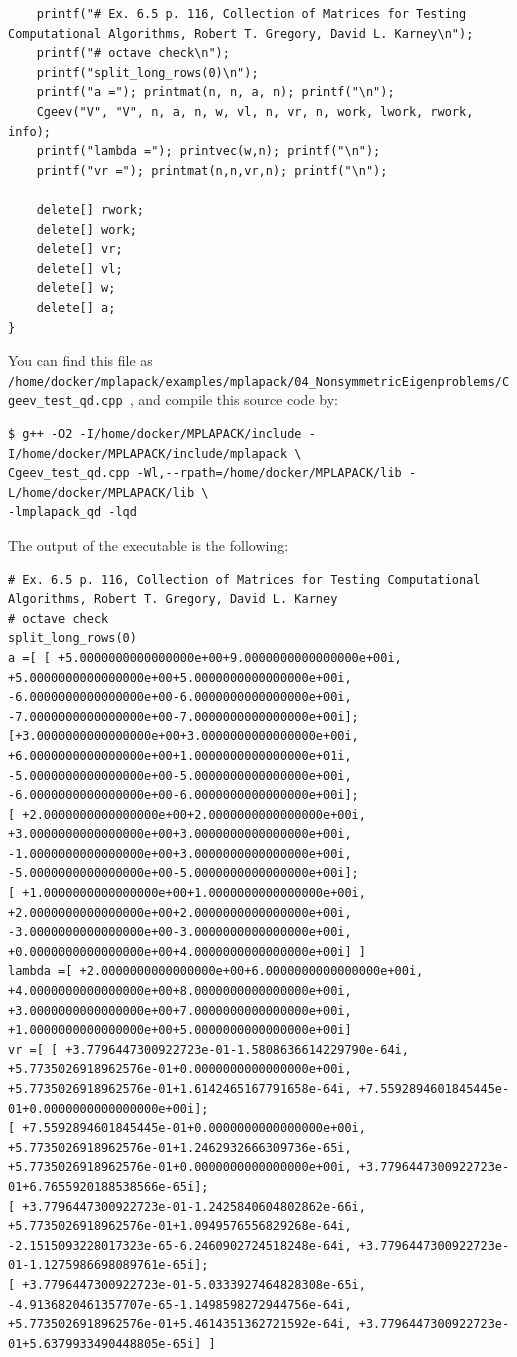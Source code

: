 \documentclass[12pt]{article}
\begin{document}
\begin{lstlisting}
    printf("# Ex. 6.5 p. 116, Collection of Matrices for Testing Computational Algorithms, Robert T. Gregory, David L. Karney\n");
    printf("# octave check\n");
    printf("split_long_rows(0)\n");
    printf("a ="); printmat(n, n, a, n); printf("\n");
    Cgeev("V", "V", n, a, n, w, vl, n, vr, n, work, lwork, rwork, info);
    printf("lambda ="); printvec(w,n); printf("\n");
    printf("vr ="); printmat(n,n,vr,n); printf("\n");

    delete[] rwork;
    delete[] work;
    delete[] vr;
    delete[] vl;
    delete[] w;
    delete[] a;
}

\end{lstlisting}
You can find this file as \\ {\tt /home/docker/mplapack/examples/mplapack/04\_NonsymmetricEigenproblems/Cgeev\_test\_qd.cpp },
and compile this source code by:
\begin{verbatim}
$ g++ -O2 -I/home/docker/MPLAPACK/include -I/home/docker/MPLAPACK/include/mplapack \
Cgeev_test_qd.cpp -Wl,--rpath=/home/docker/MPLAPACK/lib -L/home/docker/MPLAPACK/lib \
-lmplapack_qd -lqd
\end{verbatim}
The output of the executable is the following:
{\footnotesize
\begin{verbatim}
# Ex. 6.5 p. 116, Collection of Matrices for Testing Computational Algorithms, Robert T. Gregory, David L. Karney
# octave check
split_long_rows(0)
a =[ [ +5.0000000000000000e+00+9.0000000000000000e+00i, +5.0000000000000000e+00+5.0000000000000000e+00i,
-6.0000000000000000e+00-6.0000000000000000e+00i, -7.0000000000000000e+00-7.0000000000000000e+00i];
[+3.0000000000000000e+00+3.0000000000000000e+00i, +6.0000000000000000e+00+1.0000000000000000e+01i,
-5.0000000000000000e+00-5.0000000000000000e+00i, -6.0000000000000000e+00-6.0000000000000000e+00i];
[ +2.0000000000000000e+00+2.0000000000000000e+00i, +3.0000000000000000e+00+3.0000000000000000e+00i,
-1.0000000000000000e+00+3.0000000000000000e+00i, -5.0000000000000000e+00-5.0000000000000000e+00i];
[ +1.0000000000000000e+00+1.0000000000000000e+00i, +2.0000000000000000e+00+2.0000000000000000e+00i,
-3.0000000000000000e+00-3.0000000000000000e+00i, +0.0000000000000000e+00+4.0000000000000000e+00i] ]
lambda =[ +2.0000000000000000e+00+6.0000000000000000e+00i, +4.0000000000000000e+00+8.0000000000000000e+00i,
+3.0000000000000000e+00+7.0000000000000000e+00i, +1.0000000000000000e+00+5.0000000000000000e+00i]
vr =[ [ +3.7796447300922723e-01-1.5808636614229790e-64i, +5.7735026918962576e-01+0.0000000000000000e+00i,
+5.7735026918962576e-01+1.6142465167791658e-64i, +7.5592894601845445e-01+0.0000000000000000e+00i];
[ +7.5592894601845445e-01+0.0000000000000000e+00i, +5.7735026918962576e-01+1.2462932666309736e-65i,
+5.7735026918962576e-01+0.0000000000000000e+00i, +3.7796447300922723e-01+6.7655920188538566e-65i];
[ +3.7796447300922723e-01-1.2425840604802862e-66i, +5.7735026918962576e-01+1.0949576556829268e-64i,
-2.1515093228017323e-65-6.2460902724518248e-64i, +3.7796447300922723e-01-1.1275986698089761e-65i];
[ +3.7796447300922723e-01-5.0333927464828308e-65i, -4.9136820461357707e-65-1.1498598272944756e-64i,
+5.7735026918962576e-01+5.4614351362721592e-64i, +3.7796447300922723e-01+5.6379933490448805e-65i] ]
\end{verbatim}
}
\end{document}
